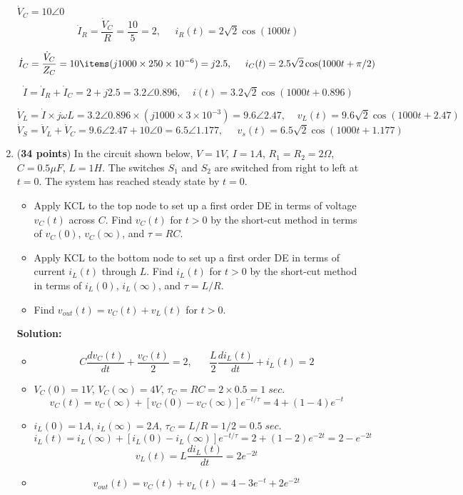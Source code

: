\begin{enumerate}
  $\dot{V}_C=10\angle 0$
  \[ 
  \dot{I}_R=\frac{\dot{V}_C}{R}=\frac{10}{5}=2,\;\;\;\;\;
  i_R(t)=2\sqrt{2}\cos(1000t)
  \]

  \[ 
  \dot{I}_C=\frac{\dot{V}_C}{Z_C}=10\items(j1000\times 250\times 10^{-6})
  =j2.5,  \;\;\;\;\;
  i_C(t)=2.5\sqrt{2}\cos(1000t+\pi/2)
  \]
  
  \[
  \dot{I}=\dot{I}_R+\dot{I}_C=2+j2.5=3.2\angle 0.896,\;\;\;\;
  i(t)=3.2\sqrt{2}\cos(1000 t+0.896)  
  \]
  
  \[
  \dot{V}_L=\dot{I}\times j\omega L
  =3.2\angle 0.896 \times (j1000\times 3\times 10^{-3})
  =9.6\angle 2.47,\;\;\;\;
  v_L(t)=9.6\sqrt{2}\cos(1000t+2.47)
  \]
  \[ 
  \dot{V}_S=\dot{V}_L+\dot{V}_C=9.6\angle 2.47+10\angle 0
  =6.5\angle 1.177,\;\;\;\;\;
  v_s(t)=6.5\sqrt{2}\cos(1000t+1.177)
  \]
  
\item ({\bf 34 points}) 
  In the circuit shown below, $V=1V$, $I=1A$, $R_1=R_2=2\Omega$,
  $C=0.5\mu F$, $L=1H$. The switches $S_1$ and $S_2$ are switched from 
  right to left at $t=0$. The system has reached steady state by $t=0$.


  \begin{itemize}
  \item Apply KCL to the top node to set up a first order DE in terms
    of voltage $v_C(t)$ across $C$. Find $v_C(t)$ for $t>0$ by the short-cut
    method in terms of $v_C(0)$, $v_C(\infty)$, and $\tau=RC$.
  \item Apply KCL to the bottom node to set up a first order DE in terms
    of current $i_L(t)$ through $L$. Find $i_L(t)$ for $t>0$ by the short-cut
    method in terms of $i_L(0)$, $i_L(\infty)$, and $\tau=L/R$.
  \item 
    Find $v_{out}(t)=v_C(t)+v_L(t)$ for $t>0$.
  \end{itemize}


  {\bf Solution:} 
  \begin{itemize}
  \item 
    \[ 
    C\frac{dv_C(t)}{dt}+\frac{v_C(t)}{2}=2,\;\;\;\;\;\;
    \frac{L}{2}\frac{di_L(t)}{dt}+i_L(t)=2
    \]
  \item $V_C(0)=1V$, $V_C(\infty)=4V$, $\tau_C=RC=2\times 0.5=1\;sec.$
    \[ 
    v_C(t)=v_C(\infty)+[v_C(0)-v_C(\infty)]e^{-t/\tau}=4+(1-4)e^{-t}
    \]
  \item $i_L(0)=1A$, $i_L(\infty)=2A$, $\tau_C=L/R=1/2=0.5\;sec.$
    \[ 
    i_L(t)=i_L(\infty)+[i_L(0)-i_L(\infty)]e^{-t/\tau}=2+(1-2)e^{-2t}=2-e^{-2t}
    \]
    \[
    v_L(t)=L\frac{di_L(t)}{dt}=2e^{-2t}
    \]
  \item
    \[
    v_{out}(t)=v_C(t)+v_L(t)=4-3e^{-t}+2e^{-2t}
    \]
  \end{itemize}

\end{enumerate}

